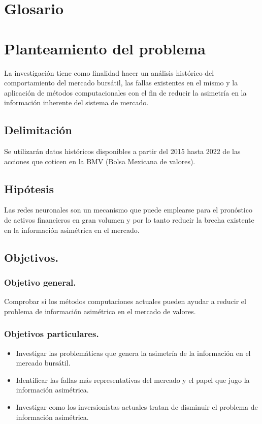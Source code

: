 \documentclass[letterpaper,12pt,oneside]{book}
\begin{document}
\newpage

\tableofcontents
\chapter{Glosario}




\chapter{Planteamiento del problema}
La investigación tiene como finalidad hacer un análisis histórico del comportamiento del mercado bursátil, las fallas existentes en el mismo y la aplicación de métodos computacionales con el fin de reducir la asimetría en la información inherente del sistema de mercado.
    \section*{Delimitación}
Se utilizarán datos históricos disponibles a partir del 2015 hasta 2022 de las acciones que coticen en la BMV (Bolsa Mexicana de valores).    
    
	\section*{Hipótesis}
Las redes neuronales son un mecanismo que puede emplearse para el pronóstico de activos financieros en gran volumen y por lo tanto reducir la brecha existente en la información asimétrica en el mercado.
    \section*{Objetivos.}       
        \subsection*{Objetivo general.}
Comprobar si los métodos computaciones actuales pueden ayudar a reducir el problema de información asimétrica en el mercado de valores.   
        \subsection*{Objetivos particulares.}
        \begin{itemize}
            \item Investigar las problemáticas que genera la asimetría de la información en el mercado bursátil.
            \item Identificar las fallas más representativas del mercado y el papel que jugo la información asimétrica.
            \item Investigar como los inversionistas actuales tratan de disminuir el problema de información asimétrica.
        \end{itemize}
    
\end{document}
